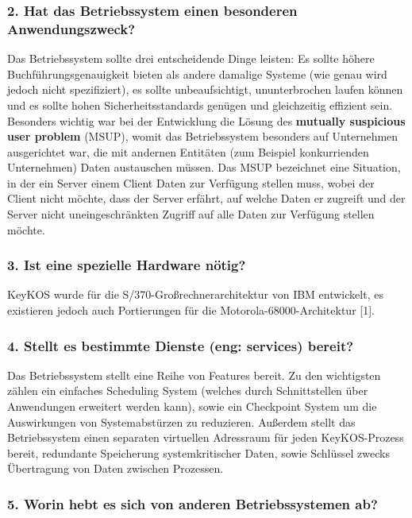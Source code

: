 \documentclass[numbers=noendperiod]{scrartcl}
\begin{document}
\subsubsection*{2. Hat das Betriebssystem einen besonderen Anwendungszweck?}

Das Betriebssystem sollte drei entscheidende Dinge leisten: Es sollte höhere Buchführungsgenauigkeit bieten als andere damalige Systeme (wie genau wird jedoch nicht spezifiziert), es sollte unbeaufsichtigt, ununterbrochen laufen können und es sollte hohen Sicherheitsstandards genügen und gleichzeitig effizient sein. Besonders wichtig war bei der Entwicklung die Lösung des \textbf{mutually suspicious user problem} (MSUP), womit das Betriebssystem besonders auf Unternehmen ausgerichtet war, die mit andernen Entitäten (zum Beispiel konkurrienden Unternehmen) Daten austauschen müssen. Das MSUP bezeichnet eine Situation, in der ein Server einem Client Daten zur Verfügung stellen muss, wobei der Client nicht möchte, dass der Server erfährt, auf welche Daten er zugreift und der Server nicht uneingeschränkten Zugriff auf alle Daten zur Verfügung stellen möchte.

\subsubsection*{3. Ist eine spezielle Hardware nötig?}

KeyKOS wurde für die S/370-Großrechnerarchitektur von IBM entwickelt, es existieren jedoch auch Portierungen für die Motorola-68000-Architektur [1].

\subsubsection*{4. Stellt es bestimmte Dienste (eng: services) bereit?}

Das Betriebssystem stellt eine Reihe von Features bereit. Zu den wichtigsten zählen ein einfaches Scheduling System (welches durch Schnittstellen über Anwendungen erweitert werden kann), sowie ein Checkpoint System um die Auswirkungen von Systemabstürzen zu reduzieren. Außerdem stellt das Betriebssystem einen separaten virtuellen Adressraum für jeden KeyKOS-Prozess bereit, redundante Speicherung systemkritischer Daten, sowie Schlüssel zwecks Übertragung von Daten zwischen Prozessen.


\subsubsection*{5. Worin hebt es sich von anderen Betriebssystemen ab?}
\end{document}
